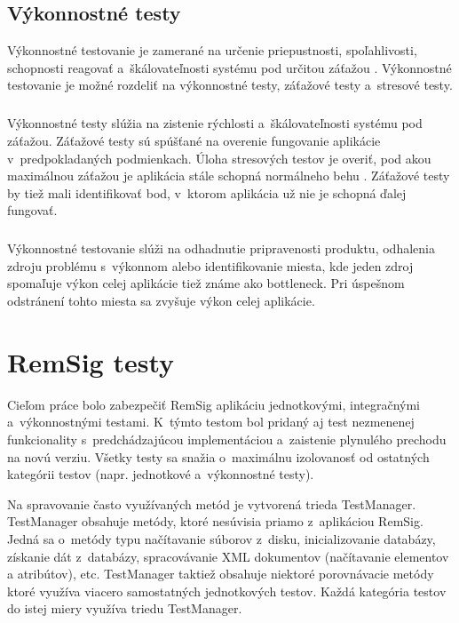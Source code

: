 \documentclass[
  digital, %
  table,   %
oneside,
  nolof,     %
  nolot,     %
]{fithesis3}
\begin{document}
\section{Výkonnostné testy}
Výkonnostné testovanie je zamerané na určenie priepustnosti, spoľahlivosti, schopnosti reagovať a~škálovateľnosti systému pod určitou záťažou \cite{ssl3.0}\cite{perfromanceTest}. Výkonnostné testovanie je možné rozdeliť na výkonnostné testy, záťažové testy a~stresové testy.\paragraph{}
Výkonnostné testy slúžia na zistenie rýchlosti a~škálovateľnosti systému pod záťažou. Záťažové testy sú spúšťané na overenie fungovanie aplikácie v~predpokladaných podmienkach. Úloha stresových  testov je overiť, pod akou maximálnou záťažou je aplikácia stále schopná normálneho behu \cite{effectiveSoftwareTesting}. Záťažové testy by tiež mali identifikovať bod, v~ktorom aplikácia už nie je schopná ďalej fungovať.\paragraph{}
Výkonnostné testovanie slúži na odhadnutie pripravenosti produktu, odhalenia zdroju problému s~výkonnom alebo  identifikovanie miesta, kde jeden zdroj spomaľuje výkon celej aplikácie tiež známe ako bottleneck. Pri úspešnom odstránení tohto miesta sa zvyšuje výkon celej aplikácie.
\chapter{RemSig testy}
Cieľom práce bolo zabezpečiť  RemSig aplikáciu jednotkovými, integračnými a~výkonnostnými testami. K~týmto testom bol pridaný aj test nezmenenej funkcionality s~predchádzajúcou implementáciou a~zaistenie plynulého prechodu na novú verziu. Všetky  testy sa snažia o~maximálnu izolovanosť od ostatných kategórii  testov (napr. jednotkové a~výkonnostné testy).

Na spravovanie často využívaných metód je vytvorená trieda TestManager. TestManager obsahuje metódy, ktoré nesúvisia priamo z~aplikáciou RemSig. Jedná sa o~metódy typu načítavanie súborov z~disku, inicializovanie databázy, získanie dát z~databázy, spracovávanie XML dokumentov (načítavanie elementov a atribútov), etc. TestManager taktiež obsahuje niektoré porovnávacie metódy ktoré využíva viacero samostatných jednotkových testov. Každá kategória testov do istej miery využíva triedu TestManager.
 
\end{document}
